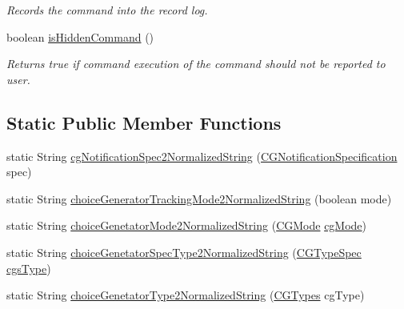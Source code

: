 \begin{DoxyCompactItemize}
\begin{DoxyCompactList}\small\item\em Records the command into the record log. \end{DoxyCompactList}\item 
boolean \hyperlink{classgov_1_1nasa_1_1jpf_1_1inspector_1_1client_1_1_client_command_afb09c400c64e2d8e01059b91ff847761}{is\+Hidden\+Command} ()
\begin{DoxyCompactList}\small\item\em Returns true if command execution of the command should not be reported to user. \end{DoxyCompactList}\end{DoxyCompactItemize}
\subsection*{Static Public Member Functions}
\begin{DoxyCompactItemize}
\item 
static String \hyperlink{classgov_1_1nasa_1_1jpf_1_1inspector_1_1client_1_1commands_1_1_cmd_choice_generators_tracking_acb5fbb46a228fa82b64578e7aa874bdb}{cg\+Notification\+Spec2\+Normalized\+String} (\hyperlink{classgov_1_1nasa_1_1jpf_1_1inspector_1_1interfaces_1_1_choice_generators_interface_1_1_c_g_notification_specification}{C\+G\+Notification\+Specification} spec)
\item 
static String \hyperlink{classgov_1_1nasa_1_1jpf_1_1inspector_1_1client_1_1commands_1_1_cmd_choice_generators_tracking_a10d7c55aa6f1078ef86d9d594977200d}{choice\+Generator\+Tracking\+Mode2\+Normalized\+String} (boolean mode)
\item 
static String \hyperlink{classgov_1_1nasa_1_1jpf_1_1inspector_1_1client_1_1commands_1_1_cmd_choice_generators_tracking_ac30e697741ac7e2fb3fde0b1e3746075}{choice\+Genetator\+Mode2\+Normalized\+String} (\hyperlink{enumgov_1_1nasa_1_1jpf_1_1inspector_1_1interfaces_1_1_choice_generators_interface_1_1_c_g_mode}{C\+G\+Mode} \hyperlink{classgov_1_1nasa_1_1jpf_1_1inspector_1_1client_1_1commands_1_1_cmd_choice_generators_tracking_ab6410ab4d33fab56087f59dbd898824b}{cg\+Mode})
\item 
static String \hyperlink{classgov_1_1nasa_1_1jpf_1_1inspector_1_1client_1_1commands_1_1_cmd_choice_generators_tracking_a255814d92a707e3a024d511c74e28453}{choice\+Genetator\+Spec\+Type2\+Normalized\+String} (\hyperlink{enumgov_1_1nasa_1_1jpf_1_1inspector_1_1client_1_1commands_1_1_cmd_choice_generators_tracking_1_1_c_g_type_spec}{C\+G\+Type\+Spec} \hyperlink{classgov_1_1nasa_1_1jpf_1_1inspector_1_1client_1_1commands_1_1_cmd_choice_generators_tracking_a407320f69637c99aa4a82d78cfc5ae07}{cgs\+Type})
\item 
static String \hyperlink{classgov_1_1nasa_1_1jpf_1_1inspector_1_1client_1_1commands_1_1_cmd_choice_generators_tracking_ac823fe1030d5ac6d37cbdc17a826d909}{choice\+Genetator\+Type2\+Normalized\+String} (\hyperlink{enumgov_1_1nasa_1_1jpf_1_1inspector_1_1interfaces_1_1_choice_generators_interface_1_1_c_g_types}{C\+G\+Types} cg\+Type)
\end{DoxyCompactItemize}
